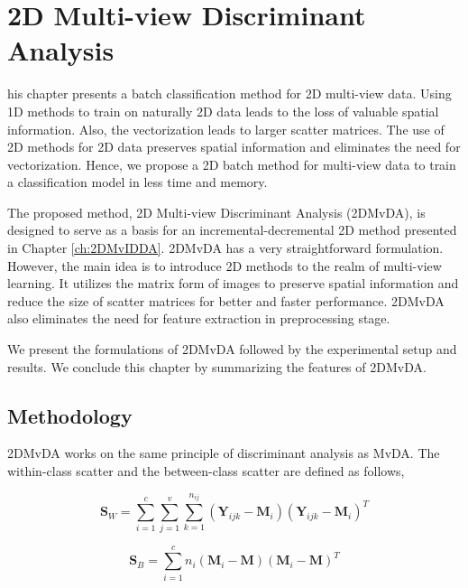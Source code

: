 \chapter{2D Multi-view Discriminant Analysis}
\label{ch:2DMvDA}
his chapter presents a batch classification method for 2D multi-view data. Using 1D methods to train on naturally 2D data leads to the loss of valuable spatial information. Also, the vectorization leads to larger scatter matrices. The use of 2D methods for 2D data preserves spatial information and eliminates the need for vectorization. Hence, we propose a 2D batch method for multi-view data to train a classification model in less time and memory.

The proposed method, 2D Multi-view Discriminant Analysis (2DMvDA), is designed to serve as a basis for an incremental-decremental 2D method presented in Chapter \ref{ch:2DMvIDDA}. 2DMvDA has a very straightforward formulation. However, the main idea is to introduce 2D methods to the realm of multi-view learning. It utilizes the matrix form of images to preserve spatial information and reduce the size of scatter matrices for better and faster performance. 2DMvDA also eliminates the need for feature extraction in preprocessing stage.

We present the formulations of 2DMvDA followed by the experimental setup and results. We conclude this chapter by summarizing the features of 2DMvDA.









\section{Methodology}
\label{sec:2DMvDA_Algo}
2DMvDA works on the same principle of discriminant analysis as MvDA. The within-class scatter and the between-class scatter are defined as follows,

\begin{equation}
\label{eqn:2DMvDA_Sw}
\textbf{S}_W = \sum_{i=1}^{c} \sum_{j=1}^{v} \sum_{k=1}^{n_{ij}} \left ( \textbf{Y}_{ijk} - \textbf{M}_{i} \right ) \left ( \textbf{Y}_{ijk} - \textbf{M}_{i} \right )^T
\end{equation}

\begin{equation}
\label{eqn:2DMvDA_Sb}
\textbf{S}_B = \sum_{i=1}^{c} n_i \left ( \textbf{M}_{i} - \textbf{M} \right ) \left ( \textbf{M}_{i} - \textbf{M} \right )^T
\end{equation}

